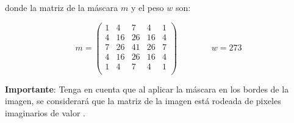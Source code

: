 donde la matriz de la máscara $m$ y el peso $w$ son:

\[
m =
\begin{pmatrix}
1 & 4 & 7 & 4 & 1\\ 
4 & 16 & 26 & 16 & 4\\
7 & 26 & 41 & 26 & 7\\
4 & 16 & 26 & 16 & 4\\
1 & 4 & 7 & 4 & 1\\
\end{pmatrix}
\qquad
\qquad
w = 273
\]


\textbf{Importante}: Tenga en cuenta que al aplicar la máscara en los 
bordes de la imagen, se considerará que la matriz de la imagen está
rodeada de pixeles imaginarios de valor .

